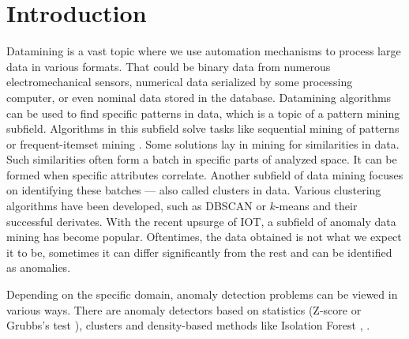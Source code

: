 \section{Introduction}
\label{sec:introduction}





Datamining is a vast topic where we use automation mechanisms to process large data in various formats. That could be binary data from numerous electromechanical sensors, numerical data serialized by some processing computer, or even nominal data stored in the database.
Datamining algorithms can be used to find specific patterns in data, which is a topic of a pattern mining subfield. Algorithms in this subfield solve tasks like sequential mining of patterns \cite{agrawal1995mining} or frequent-itemset mining \cite{agrawal1994fast}. 
Some solutions lay in mining for similarities in data. Such similarities often form a batch in specific parts of analyzed space. It can be formed when specific attributes correlate. Another subfield of data mining focuses on identifying these batches --- also called clusters in data. Various clustering algorithms have been developed, such as DBSCAN \cite{Ester1996dbscan} or \(k\)-means \cite{lloyd1982kmeans} and their successful derivates.
With the recent upsurge of IOT, a subfield of anomaly data mining has become popular. Oftentimes, the data obtained is not what we expect it to be, sometimes it can differ significantly from the rest and can be identified as anomalies.



Depending on the specific domain, anomaly detection problems can be viewed in various ways. There are anomaly detectors based on statistics (Z-score or Grubbs's test \cite{grubbs1949sample}), clusters \cite{he2003discovering} and density-based methods like Isolation Forest \cite{liu2008isolation}, \cite{liu2012isolation}.


